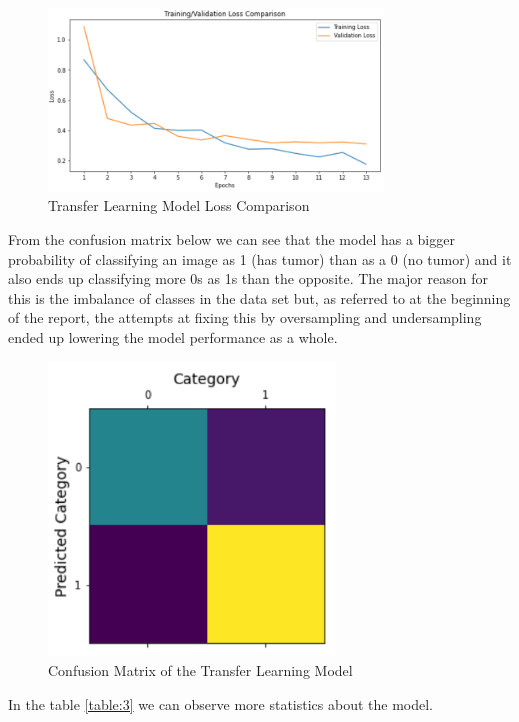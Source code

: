 \documentclass[conference]{IEEEtran}
\begin{document}
\begin{figure}[H]
    \centering
    \includegraphics[width=3.5in]{transferl_val_loss.PNG}
    \caption{Transfer Learning Model Loss Comparison}\label{fig:fig15}
\end{figure}

From the confusion matrix below we can see that the model has a bigger probability of classifying an image as 1 (has tumor) than as a 0 (no tumor) and it also ends up classifying more 0s as 1s than the opposite. The major reason for this is the imbalance of classes in the data set but, as referred to at the beginning of the report, the attempts at fixing this by oversampling and undersampling ended up lowering the model performance as a whole.

\begin{figure}[H]
    \centering
    \includegraphics[width=3in]{tl_conf_matrix.PNG}
    \caption{Confusion Matrix of the Transfer Learning Model}\label{fig:fig6}
\end{figure}

In the table \ref{table:3} we can observe more statistics about the model.
\end{document}
